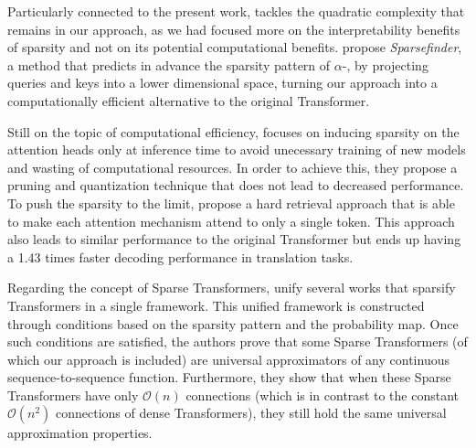 Particularly connected to the present work,
\citet{treviso2021PredictingAttentionSparsity} tackles the quadratic
complexity that remains in our approach, as we had focused more on
the interpretability benefits of sparsity and not on its potential
computational benefits.
\citet{treviso2021PredictingAttentionSparsity} propose
\emph{Sparsefinder}, a method that predicts in advance the sparsity
pattern of $\alpha$-\entmaxtext, by projecting queries and keys into
a lower dimensional space, turning our approach into a
computationally efficient alternative to the original Transformer.

Still on the topic of computational efficiency,
\citet{ji2021DistributionSparsityInferencetime} focuses on inducing
sparsity on the attention heads only at inference time to avoid
unecessary training of new models and wasting of computational
resources. In order to achieve this, they propose a pruning and
quantization technique that does not lead to decreased performance.
To push the sparsity to the limit,
\citet{xu2021LearningHardRetrieval} propose a hard retrieval approach
that is able to make each attention mechanism attend to only a single
token. This approach also leads to similar performance to the
original Transformer but ends up having a 1.43 times faster decoding
performance in translation tasks.

Regarding the concept of Sparse Transformers,
\citet{yun2020ConnectionsareExpressive} unify several works that
sparsify Transformers in a single framework.
This unified framework is constructed through conditions based on the
sparsity pattern and the probability map. Once such conditions are
satisfied, the authors prove that some Sparse Transformers (of which
our approach is included) are universal approximators of any
continuous sequence-to-sequence function. Furthermore, they show that
when these Sparse Transformers have only $\mathcal{O}(n)$ connections (which is
in contrast to the constant $\mathcal{O}(n^2)$ connections of dense
Transformers), they still hold the same universal approximation
properties.

